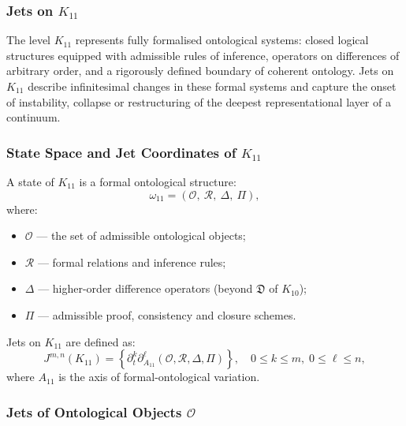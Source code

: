 
\subsubsection{Jets on $K_{11}$}
\label{sec:jets-k11}

The level $K_{11}$ represents fully formalised ontological systems:
closed logical structures equipped with admissible rules of inference,
operators on differences of arbitrary order, and a rigorously defined
boundary of coherent ontology. Jets on $K_{11}$ describe infinitesimal
changes in these formal systems and capture the onset of instability,
collapse or restructuring of the deepest representational layer of a
continuum.


\subsubsection{State Space and Jet Coordinates of $K_{11}$}

A state of $K_{11}$ is a formal ontological structure:
\[
\omega_{11}
=
(\mathcal{O},\ \mathcal{R},\ \Delta,\ \Pi),
\]
where:
\begin{itemize}
    \item $\mathcal{O}$ — the set of admissible ontological objects;
    \item $\mathcal{R}$ — formal relations and inference rules;
    \item $\Delta$ — higher-order difference operators
                     (beyond $\mathfrak{D}$ of $K_{10}$);
    \item $\Pi$ — admissible proof, consistency and closure schemes.
\end{itemize}

Jets on $K_{11}$ are defined as:
\[
J^{m,n}(K_{11}) =
\left\{
\partial_t^k\partial_{A_{11}}^\ell
(\mathcal{O},\mathcal{R},\Delta,\Pi)
\right\},
\quad
0\le k\le m,\; 0\le\ell\le n,
\]
where $A_{11}$ is the axis of formal-ontological variation.


\subsubsection{Jets of Ontological Objects $\mathcal{O}$}

